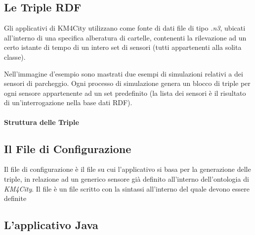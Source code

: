 \documentclass[12pt,a4paper,italian]{article}
\begin{document}
\subsection{Le Triple RDF}
Gli applicativi di KM4City utilizzano come fonte di dati file di tipo \emph{.n3}, ubicati all'interno di una specifica alberatura di cartelle, 
contenenti la rilevazione ad un certo istante di tempo di un intero set di sensori (tutti appartenenti alla solita classe).


Nell'immagine d'esempio sono mastrati due esempi di simulazioni relativi a dei
sensori di parcheggio. Ogni processo di simulazione genera un blocco di triple
per ogni sensore appartenente ad un set predefinito (la lista dei sensori è il
risultato di un'interrogazione nella base dati RDF).
\paragraph{Struttura delle Triple}

\subsection{Il File di Configurazione}
Il file di configurazione è il file su cui l'applicativo si basa per la generazione delle triple, in relazione ad un generico sensore già definito all'interno
dell'ontologia di \emph{KM4City}. Il file è un file scritto con la sintassi  all'interno del quale devono essere definite 
\subsection{L'applicativo Java}
\end{document}
